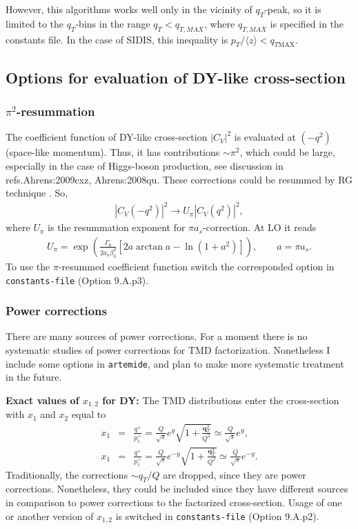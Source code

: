 \documentclass[prd,nofootinbib,eqsecnum,final]{revtex4}
\newcommand{\nn}{\nonumber}
\renewcommand{\(}{\left(}
\renewcommand{\)}{\right)}
\renewcommand{\[}{\left[}
\renewcommand{\]}{\right]}
\renewcommand{\vec}[1]{\bm{#1}}
\begin{document}
However, this algorithms works well only in the vicinity of $q_T$-peak, so it is limited to the $q_T$-bins in the range $q_T<q_{T,MAX}$, where $q_{T,MAX}$ is specified in the constants file. In the case of SIDIS, this inequality is $p_T/\langle z\rangle<q_{T\text{MAX}}$.


\subsection{Options for evaluation of DY-like cross-section}

\subsubsection{$\pi^2$-resummation}

The coefficient function of DY-like cross-section $|C_V|^2$ is evaluated at $(-q^2)$ (space-like momentum). Thus, it has contributions $\sim \pi^2$, which could be large, especially in the case of Higgs-boson production, see discussion in  refs.{Ahrens:2009cxz, Ahrens:2008qu}. These corrections could be resummed by RG technique \cite{Ahrens:2008qu}. So,
\begin{eqnarray}
|C_V(-q^2)|^2\to U_\pi |C_V(q^2)|^2,
\end{eqnarray}
where $U_\pi$ is the resummation exponent for $\pi a_s$-correction. At LO it reads \cite{Ahrens:2008qu}
\begin{eqnarray}
U_\pi=\exp\(\frac{\Gamma_0}{2a_s\beta_0^2}[2 a \arctan a-\ln(1+a^2)]\),\qquad a=\pi a_s.
\end{eqnarray}
To use the $\pi$-resummed coefficient function switch the corresponded option in \texttt{constants-file} (Option 9.A.p3).

\subsubsection{Power corrections}

There are many sources of power corrections. For a moment there is no systematic studies of power corrections for TMD factorization. Nonetheless I include some options in \texttt{artemide}, and plan to make more systematic treatment in the future.

\textbf{Exact values of $x_{1,2}$ for DY:} The TMD distributions enter the cross-section with $x_1$ and $x_2$ equal to
\begin{eqnarray}
x_1&=&\frac{q^+}{p_1^+}=\frac{Q}{\sqrt{s}}e^y\sqrt{1+\frac{\vec q_T^2}{Q^2}}\simeq \frac{Q}{\sqrt{s}}e^y,
\\\nn
x_1&=&\frac{q^+}{p_1^+}=\frac{Q}{\sqrt{s}}e^{-y}\sqrt{1+\frac{\vec q_T^2}{Q^2}} \simeq \frac{Q}{\sqrt{s}}e^{-y}.
\end{eqnarray}
Traditionally, the corrections $\sim q_T/Q$ are dropped, since they are power corrections. Nonetheless, they could be included since they have different sources in comparison to power corrections to the factorized cross-section. Usage of one or another version of $x_{1,2}$ is switched in \texttt{constants-file} (Option 9.A.p2).
\end{document}
